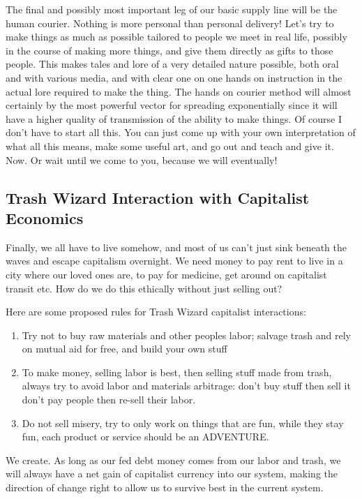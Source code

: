 The final and possibly most important leg of our basic supply line will
be the human courier. Nothing is more personal than personal delivery!
Let's try to make things as much as possible tailored to people we meet
in real life, possibly in the course of making more things, and give
them directly as gifts to those people. This makes tales and lore of a
very detailed nature possible, both oral and with various media, and
with clear one on one hands on instruction in the actual lore required
to make the thing. The hands on courier method will almost certainly by
the most powerful vector for spreading exponentially since it will have
a higher quality of transmission of the ability to make things. Of
course I don't have to start all this. You can just come up with your
own interpretation of what all this means, make some useful art, and go
out and teach and give it. Now. Or wait until we come to you, because we
will eventually!

\subsection{Trash Wizard Interaction with Capitalist
Economics}\label{trash-wizard-interaction-with-capitalist-economics}

Finally, we all have to live somehow, and most of us can't just sink
beneath the waves and escape capitalism overnight. We need money to pay
rent to live in a city where our loved ones are, to pay for medicine,
get around on capitalist transit etc. How do we do this ethically
without just selling out?

Here are some proposed rules for Trash Wizard capitalist interactions:

\begin{enumerate}
\def\labelenumi{\arabic{enumi}.}
\tightlist
\item
  Try not to buy raw materials and other peoples labor; salvage trash
  and rely on mutual aid for free, and build your own stuff
\item
  To make money, selling labor is best, then selling stuff made from
  trash, always try to avoid labor and materials arbitrage: don't buy
  stuff then sell it don't pay people then re-sell their labor.\\
\item
  Do not sell misery, try to only work on things that are fun, while
  they stay fun, each product or service should be an ADVENTURE.
\end{enumerate}

We create. As long as our fed debt money comes from our labor and trash,
we will always have a net gain of capitalist currency into our system,
making the direction of change right to allow us to survive best in the
current system.
